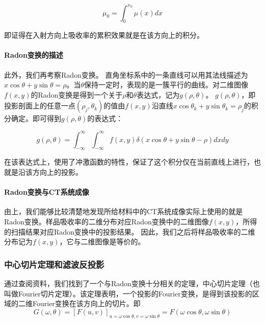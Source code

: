 \documentclass[withoutpreface,bwprint]{cumcmthesis} %
\begin{document}
        \begin{equation}
          \mu_{0} = \int_0^{x_0}{\mu(x)dx}
        \end{equation}

        即证得在入射方向上吸收率的累积效果就是在该方向上的积分。

      \paragraph{Radon变换的描述}

        此外，我们再考察Radon变换。
        直角坐标系中的一条直线可以用其法线描述为$x\cos\theta + y\sin\theta = \rho$。当$\theta$保持一定时，表现的是一簇平行的曲线。对二维图像$f(x, y)$的Radon变换是得到一个关于$\rho$和$\theta$表达式，记为$g(\rho, \theta)$。
        $g(\rho, \theta)$，即投影剖面上的任意一点$(\rho_j, \theta_k)$的值由$f(x, y)$沿直线$x\cos\theta_k + y\sin\theta_k = \rho_j$的积分确定。即可得到$g(\rho, \theta)$的表达式\cite{uuzi}：

        \begin{equation}
          g(\rho, \theta) = \int_{-\infty}^{\infty}\int_{-\infty}^{\infty}f(x, y)\delta(x\cos\theta + y\sin\theta - \rho)dxdy
        \end{equation}

        在该表达式上，使用了冲激函数的特性，保证了这个积分仅在当前直线上进行，也就是沿该方向上的投影。

      \paragraph{Radon变换与CT系统成像}

        由上，我们能够比较清楚地发现所给材料中的CT系统成像实际上使用的就是Radon变换。样品吸收率的二维分布对应Radon变换中的二维图像$f(x,y)$，所得的扫描结果对应Radon变换中的投影结果。
        因此，我们之后将样品吸收率的二维分布记为$f(x,y)$，它与二维图像是等价的。

    \subsubsection{中心切片定理和滤波反投影}
      通过查阅资料，我们找到了一个与Radon变换十分相关的定理，中心切片定理（也叫做Fourier切片定理）。该定理表明，一个投影的Fourier变换，是得到该投影的区域的二维Fourier变换在该方向上的切片。即\cite{yixt}
      \begin{equation}
        G(\omega, \theta) = [F(u, v)]_{u = \omega \cos \theta, v = \omega \sin \theta} = F(\omega \cos \theta, \omega \sin \theta)
      \end{equation}
\end{document}
